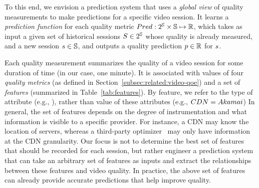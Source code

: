 To this end, we envision a prediction system that 
uses a {\em global view} of quality measurements to 
make predictions for a specific video session. %
It learns a {\em prediction function} for each 
quality metric
$Pred:2^\mathbb{S}\times\mathbb{S}\mapsto \mathbb{R}$,
which takes as input a given set of historical 
sessions $S \in 2^\mathbb{S}$ 
whose quality  is already measured, and a new 
session $s\in\mathbb{S}$, and 
outputs a quality prediction $p\in\mathbb{R}$ for 
$s$.


Each quality measurement %
summarizes the quality of a video session
for some duration of time (in our case, one minute). 
It is associated with values of four 
{\em quality metrics} (as defined in 
Section~\ref{subsec:related:video-qoe}) and 
a set of {\em features}
(summarized in Table~\ref{tab:features}).  
By feature,  we refer to the type of attribute 
(e.g., \fCDN), rather than value of these attributes 
(e.g., $CDN=Akamai$)
In general, the set of features depends on the degree 
of instrumentation and
what information is visible to a specific provider. 
For instance, a CDN may know the location of servers, 
whereas a third-party optimizer~\cite{conviva} may 
only have information at the CDN granularity. 
Our focus is not to determine the best set of 
features that should be recorded for each session, 
but rather engineer a prediction system that can 
take  an arbitrary set of features as inputs and 
extract the relationships between these features
and video quality. In practice, the above set of 
features can already provide accurate predictions 
that help improve quality.


